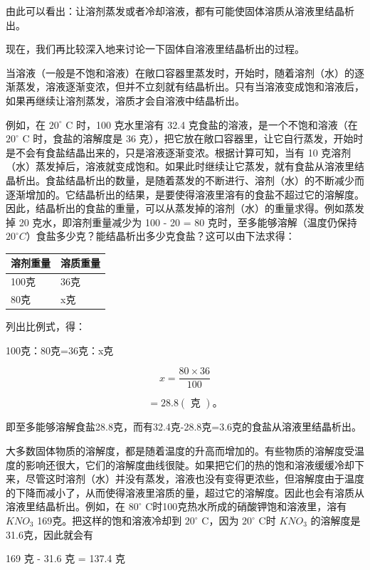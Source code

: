 由此可以看出：让溶剂蒸发或者冷却溶液，都有可能使固体溶质从溶液里结晶析出。

现在，我们再比较深入地来讨论一下固体自溶液里结晶析出的过程。

当溶液（一般是不饱和溶液）在敞口容器里蒸发时，开始时，随着溶剂（水）的逐渐蒸发，溶液逐渐变浓，但并不立刻就有结晶析出。只有当溶液变成饱和溶液后，如果再继续让溶剂蒸发，溶质才会自溶液中结晶析出。

例如，在 \(20^{\circ}\) C 时，100 克水里溶有 32.4
克食盐的溶液，是一个不饱和溶液（在 \(20^{\circ}\) C 时，食盐的溶解度是
36
克），把它放在敞口容器里，让它自行蒸发，开始时是不会有食盐结晶出来的，只是溶液逐渐变浓。根据计算可知，当有
10
克溶剂（水）蒸发掉后，溶液就变成饱和。如果此时继续让它蒸发，就有食盐从溶液里结晶析出。食盐结晶析出的数量，是随着蒸发的不断进行、溶剂（水）的不断减少而逐渐增加的。它结晶析出的结果，是要使得溶液里溶有的食盐不超过它的溶解度。因此，结晶析出的食盐的重量，可以从蒸发掉的溶剂（水）的重量求得。例如蒸发掉
20 克水，即溶剂重量减少为 100 - 20 = 80 克时，至多能够溶解（温度仍保持
\(20^{\circ}C\)）食盐多少克？能结晶析出多少克食盐？这可以由下法求得：

{\def\LTcaptype{none} %
\begin{longtable}[]{@{}ll@{}}
\toprule\noalign{}
溶剂重量 & 溶质重量 \\
\midrule\noalign{}
\endhead
\bottomrule\noalign{}
\endlastfoot
100克 & 36克 \\
80克 & x克 \\
\end{longtable}
}

列出比例式，得：

100克：80克=36克：x克

\[
x = \frac {80 \times 36}{100}
\]

\[
= 28.8 (\text{ 克 }) \text{。}
\]

即至多能够溶解食盐28.8克，而有32.4克-28.8克=3.6克的食盐从溶液里结晶析出。

大多数固体物质的溶解度，都是随着温度的升高而增加的。有些物质的溶解度受温度的影响还很大，它们的溶解度曲线很陡。如果把它们的热的饱和溶液缓缓冷却下来，尽管这时溶剂（水）并没有蒸发，溶液也没有变得更浓些，但溶解度由于温度的下降而减小了，从而使得溶液里溶质的量，超过它的溶解度。因此也会有溶质从溶液里结晶析出。例如，在
\(80^{\circ}\) C时100克热水所成的硝酸钾饱和溶液里，溶有 \(KNO_{3}\)
169克。把这样的饱和溶液冷却到 \(20^{\circ}\) C，因为 \(20^{\circ}\) C时
\(KNO_{3}\) 的溶解度是31.6克，因此就会有

169 克 - 31.6 克 = 137.4 克

